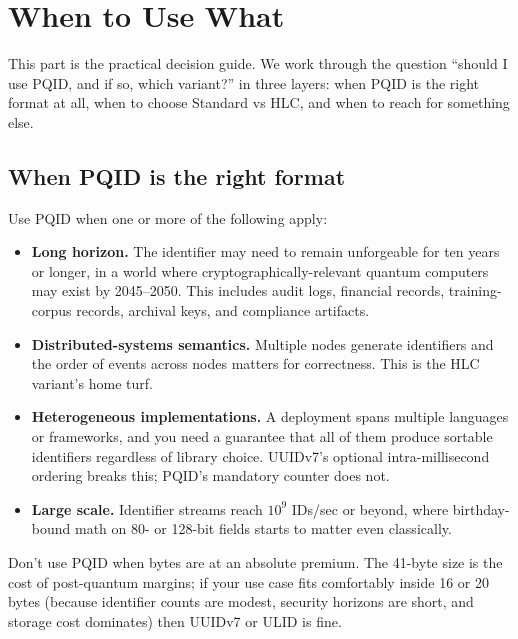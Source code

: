 \section{When to Use What}
\label{sec:when}

This part is the practical decision guide. We work through the question ``should I use PQID, and if so, which variant?'' in three layers: when PQID is the right format at all, when to choose Standard vs HLC, and when to reach for something else.

\subsection{When PQID is the right format}

Use PQID when one or more of the following apply:

\begin{itemize}
  \item \textbf{Long horizon.} The identifier may need to remain unforgeable for ten years or longer, in a world where cryptographically-relevant quantum computers may exist by 2045--2050. This includes audit logs, financial records, training-corpus records, archival keys, and compliance artifacts.
  \item \textbf{Distributed-systems semantics.} Multiple nodes generate identifiers and the order of events across nodes matters for correctness. This is the HLC variant's home turf.
  \item \textbf{Heterogeneous implementations.} A deployment spans multiple languages or frameworks, and you need a guarantee that all of them produce sortable identifiers regardless of library choice. UUIDv7's optional intra-millisecond ordering breaks this; PQID's mandatory counter does not.
  \item \textbf{Large scale.} Identifier streams reach $10^9$ IDs/sec or beyond, where birthday-bound math on 80- or 128-bit fields starts to matter even classically.
\end{itemize}

Don't use PQID when bytes are at an absolute premium. The 41-byte size is the cost of post-quantum margins; if your use case fits comfortably inside 16 or 20 bytes (because identifier counts are modest, security horizons are short, and storage cost dominates) then UUIDv7 or ULID is fine.

